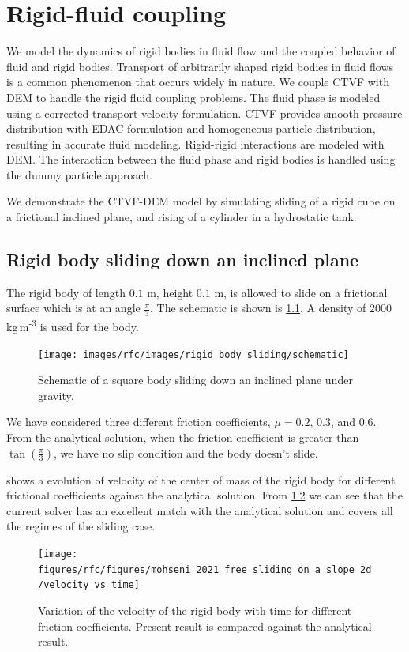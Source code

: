 \FloatBarrier%
\chapter{Rigid-fluid coupling}
\label{chap:rfc}
We model the dynamics of rigid bodies in fluid flow and the coupled behavior of
fluid and rigid bodies. Transport of arbitrarily shaped rigid bodies in fluid
flows is a common phenomenon that occurs widely in nature. We couple CTVF with
DEM to handle the rigid fluid coupling problems. The fluid phase is modeled
using a corrected transport velocity formulation. CTVF provides smooth pressure
distribution with EDAC formulation and homogeneous particle distribution,
resulting in accurate fluid modeling. Rigid-rigid interactions are modeled with
DEM. The interaction between the fluid phase and rigid bodies is handled using
the dummy particle approach.

We demonstrate the CTVF-DEM model by simulating sliding of a rigid cube on a
frictional inclined plane, and rising of a cylinder in a
hydrostatic tank.


\FloatBarrier%
\section{Rigid body sliding down an inclined plane}
\label{sec:rigid-body-sliding}
The rigid body of length $0.1$ m, height
$0.1$ m, is allowed to slide on a frictional surface which is at an angle
$\frac{\pi}{3}$. The schematic is shown is \cref{fig:rigid_body_sliding}. A
density of $2000$ kg\,m\textsuperscript{-3} is used for the body.
\begin{figure}[!htpb]
  \centering
  \texttt{[image: images/rfc/images/rigid\_body\_sliding/schematic]}
  \caption{Schematic of a square body sliding down an inclined plane under gravity.}
\label{fig:rigid_body_sliding}
\end{figure}
We have considered three different friction coefficients, $\mu=0.2$, $0.3$, and
$0.6$. From the analytical solution, when the friction coefficient is greater
than $\tan(\frac{\pi}{3})$, we have no slip condition and the body doesn't
slide.

 shows a evolution of
velocity of the center of mass of the rigid body for different frictional
coefficients against the analytical solution. From
\cref{fig:results-solid-sliding-velocity-vs-time-2d} we can see that the current
solver has an excellent match with the analytical solution and covers all the
regimes of the sliding case.
\begin{figure}[!htpb]
  \centering
  \texttt{[image: figures/rfc/figures/mohseni\_2021\_free\_sliding\_on\_a\_slope\_2d/velocity\_vs\_time]}
  \caption{Variation of the velocity of the rigid body with time for different
    friction coefficients. Present result is compared against the analytical
    result.}
\label{fig:results-solid-sliding-velocity-vs-time-2d}
\end{figure}


